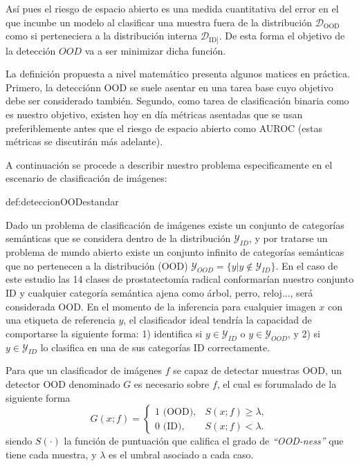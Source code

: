 Así pues el riesgo de espacio abierto es una medida cuantitativa del error en el que incunbe un modelo
al clasificar una muestra fuera de la distribución $\mathcal{D}_{\mathrm{OOD}}$ como si perteneciera a la distribución
interna $\mathcal{D}_{\mathrm{ID}]}$. De esta forma el objetivo de la detección $OOD$ va a ser minimizar dicha función.

La definición propuesta a nivel matemático presenta algunos matices en práctica. Primero, la detecciónn OOD se suele asentar en 
una tarea base cuyo objetivo debe ser considerado también. Segundo, como tarea de clasificación binaria como es nuestro objetivo, existen hoy en día métricas asentadas que se usan preferiblemente 
antes que el riesgo de espacio abierto como AUROC (estas métricas se discutirán más adelante).

A continuación se procede a describir nuestro problema especificamente en el escenario de clasificación de imágenes:    

\begin{definicion}{def:deteccionOODestandar}

\end{definicion} Dado un problema de clasificación de imágenes existe un conjunto de categorías semánticas que se considera 
dentro de la distribución $\mathcal{Y}_{ID}$, y por tratarse un problema de mundo abierto existe un conjunto infinito de categorías semánticas que no 
pertenecen a la distribución (OOD) $\mathcal{Y}_{OOD}=\{y\vert{}y\notin\mathcal{Y}_{ID}\}$. En el caso de este estudio las 14 clases de prostatectomía radical conformarían nuestro 
conjunto ID y cualquier categoría semántica ajena como árbol, perro, reloj..., será considerada OOD. En el momento de la inferencia para cualquier imagen $x$ con una etiqueta de referencia $y$, 
el clasificador ideal tendría la capacidad de comportarse la siguiente forma: 1) identifica si 
$y \in \mathcal{Y}_{ID}$ o $y \in \mathcal{Y}_{OOD}$, y 2) si $y \in \mathcal{Y}_{ID}$ lo clasifica en una de sus categorías ID 
correctamente.

Para que un clasificador de imágenes $f$ se capaz de detectar muestras OOD, un detector OOD denominado $G$ es necesario sobre $f$, el cual es forumalado de la siguiente forma
\[
G(x;f)=
\begin{cases}
1 \text{ (OOD)}, & S(x;f)\geq \lambda,\\
0 \text{ (ID)}, & S(x;f)<\lambda.
\end{cases}
\]
siendo $S(\cdot)$ la función de puntuación que califica el grado de \textit{``OOD-ness''} que tiene cada muestra, y $\lambda$ es el umbral asociado a cada caso.


